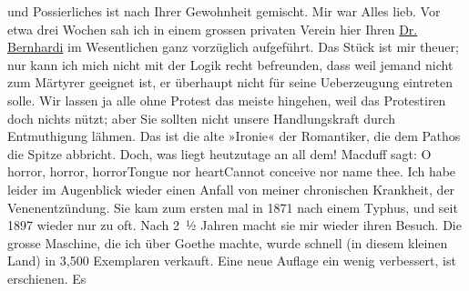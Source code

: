 \begin{ledgroupsized}[t]{13cm}
                    und Possierliches ist nach Ihrer Gewohnheit gemischt. Mir war Alles lieb.\pend
           \pstart
           Vor etwa drei Wochen sah ich in {\pb}einem grossen privaten
                    Verein hier Ihren \uline{Dr. Bernhardi} im Wesentlichen ganz vorzüglich aufgeführt. Das Stück ist mir theuer; nur
                    kann ich mich nicht mit der Logik recht befreunden, dass weil jemand nicht zum
                    Märtyrer geeignet ist, er überhaupt nicht für seine Ueberzeugung eintreten
                    solle. Wir lassen ja alle ohne Protest das meiste hingehen, weil das Protestiren
                    doch nichts nützt; aber Sie sollten nicht unsere Handlungskraft durch
                    Entmuthigung lähmen. Das ist die alte »Ironie« der Romantiker, die dem Pathos
                    die Spitze abbricht.\pend
           \pstart
           Doch, was liegt heutzutage an all dem! Macduff sagt:\pend
           \stanza{}O horror, horror, horror\newverse{}Tongue nor heart\newverse{}Cannot conceive nor name
                            thee.\stanzaend{}\pstart
           {\pb}Ich habe leider im
                    Augenblick wieder einen Anfall von meiner chronischen Krankheit, der
                    Venenentzündung. Sie kam zum ersten mal in 1871 nach einem Typhus,
                    und seit 1897 wieder nur zu oft. Nach 2 ½ Jahren macht sie mir
                    wieder ihren Besuch.\pend
           \pstart
           Die grosse Maschine, die ich
                    über Goethe machte, wurde schnell (in diesem
                    kleinen Land) in 3,500
                    Exemplaren verkauft. Eine neue Auflage ein wenig verbessert, ist erschienen. Es

\end{ledgroupsized}
